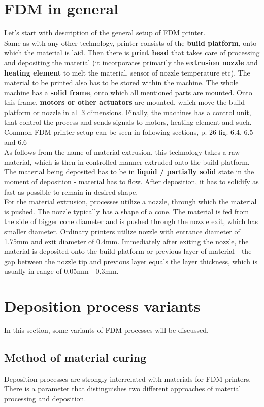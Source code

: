 \documentclass[a4paper, twoside, 11pt]{report}
\begin{document}
\section{FDM in general}
Let's start with description of the general setup of FDM printer.\\
	Same as with any other technology, printer consists of the \textbf{build platform}, onto which the material is laid. Then there is \textbf{print head} that takes care of processing and depositing the material (it incorporates primarily the \textbf{extrusion nozzle} and \textbf{heating element} to melt the material, sensor of nozzle temperature etc). The material to be printed also has to be stored within the machine. The whole machine has a \textbf{solid frame}, onto which all mentioned parts are mounted. Onto this frame, \textbf{motors or other actuators} are mounted, which move the build platform or nozzle in all 3 dimensions. Finally, the machines has a control unit, that control the process and sends signals to motors, heating element and such.\\
	Common FDM printer setup can be seen in following sections, p. 26 fig. 6.4, 6.5 and 6.6\\
	As follows from the name of material extrusion, this technology takes a raw material, which is then in controlled manner extruded onto the build platform. The material being deposited has to be in \textbf{liquid / partially solid} state in the moment of deposition - material has to flow. After deposition, it has to solidify as fast as possible to remain in desired shape.\\
	For the material extrusion, processes utilize a nozzle, through which the material is pushed. The nozzle typically has a shape of a cone. The material is fed from the side of bigger cone diameter and is pushed through the nozzle exit, which has smaller diameter. Ordinary printers utilize nozzle with entrance diameter of 1.75mm and exit diameter of 0.4mm. Immediately after exiting the nozzle, the material is deposited onto the build platform or previous layer of material - the gap between the nozzle tip and previous layer equals the layer thickness, which is usually in range of 0.05mm - 0.3mm.

\section{Deposition process variants}
In this section, some variants of FDM processes will be discussed.
\subsection{Method of material curing}
Deposition processes are strongly interrelated with materials for FDM printers. There is a parameter that distinguishes two different approaches of material processing and deposition.
\end{document}
